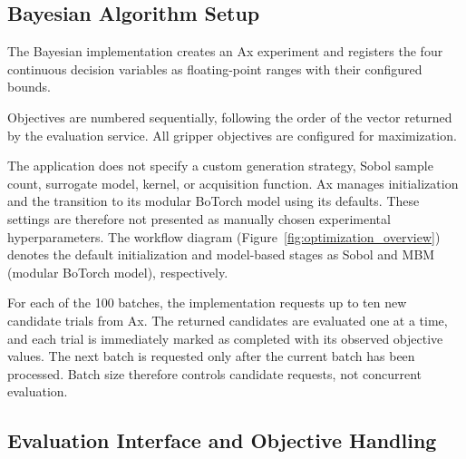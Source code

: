 \subsection{Bayesian Algorithm Setup}

The Bayesian implementation creates an Ax experiment and registers the four
continuous decision variables as floating-point ranges with their configured
bounds.

Objectives are numbered sequentially, following the order of the vector
returned by the evaluation service. All gripper objectives are configured
for maximization.

The application does not specify a custom generation strategy, Sobol sample
count, surrogate model, kernel, or acquisition function. Ax manages
initialization and the transition to its modular BoTorch model using its
defaults. These settings are therefore not presented as manually chosen
experimental hyperparameters. The workflow diagram (Figure~\ref{fig:optimization_overview}) denotes the default
initialization and model-based stages as Sobol and MBM (modular BoTorch model), respectively.

For each of the 100 batches, the implementation requests up to ten new
candidate trials from Ax. The returned candidates are evaluated one at a time,
and each trial is immediately marked as completed with its observed objective
values. The next batch is requested only after the current batch has been
processed. Batch size therefore controls candidate requests, not concurrent
evaluation.

\subsection{Evaluation Interface and Objective Handling}
\label{sec:objective_direction_conventions}
\label{sec:two_finger_optimization_loop}

